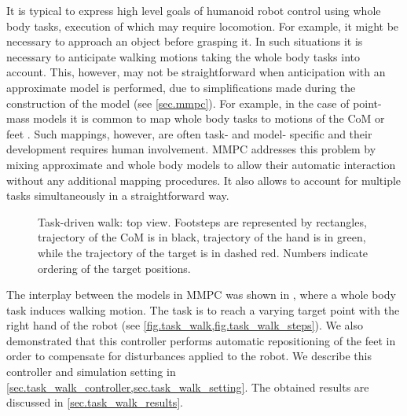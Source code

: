 It is typical to express high level goals of humanoid robot control using whole
body tasks, execution of which may require locomotion. For example, it might be
necessary to approach an object before grasping it. In such situations it is
necessary to anticipate walking motions taking the whole body tasks into
account. This, however, may not be straightforward when anticipation with an
approximate model is performed, due to simplifications made during the
construction of the model (see \cref{sec.mmpc}). For example, in the case of
point-mass models it is common to map whole body tasks to motions of the
\ac{CoM} or feet \cite{Yoshida2006humanoids, Nishiwaki2003icra,
Fukumoto2004iros, Herdt2010auro}. Such mappings, however, are often task- and
model- specific and their development requires human involvement. \acf{MMPC}
addresses this problem by mixing approximate and whole body models to allow
their automatic interaction without any additional mapping procedures. It also
allows to account for multiple tasks simultaneously in a straightforward way.

%
\begin{figure}[!htb]
    \begin{minipage}[t]{\textwidth}
    \end{minipage}
    \begin{minipage}[t]{\textwidth}
    \end{minipage}
    \caption[Task-driven walk: top view.]{
        Task-driven walk: top view. Footsteps are represented by rectangles,
        trajectory of the \ac{CoM} is in black, trajectory of the hand is in
        green, while the trajectory of the target is in dashed red. Numbers
        indicate ordering of the target positions.
    }
    \label{fig.task_walk_steps}
\end{figure}
%

The interplay between the models in \ac{MMPC} was shown in
\cite{Sherikov2014humanoids}, where a whole body task induces walking motion.
The task is to reach a varying target point with the right hand of the robot
(see \cref{fig.task_walk,fig.task_walk_steps}). We also demonstrated that this
controller performs automatic repositioning of the feet in order to compensate
for disturbances applied to the robot. We describe this controller and
simulation setting in \cref{sec.task_walk_controller,sec.task_walk_setting}.
The obtained results are discussed in \cref{sec.task_walk_results}.




